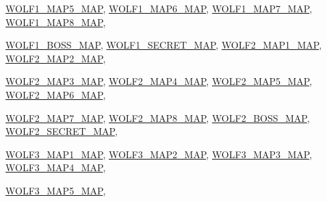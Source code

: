 \begin{DoxyCompactItemize}
\par
\hyperlink{MAPSWL6_8H_a1949852ef0462081a2b248dd4918bb86a4e0bde90495c18df66dc08481ea49be0}{WOLF1\_\-MAP5\_\-MAP}, 
\hyperlink{MAPSWL6_8H_a1949852ef0462081a2b248dd4918bb86ae26f3af31d4810858254489121a1cc4d}{WOLF1\_\-MAP6\_\-MAP}, 
\hyperlink{MAPSWL6_8H_a1949852ef0462081a2b248dd4918bb86a7f93aa33b8f8b41d2484854bac19541f}{WOLF1\_\-MAP7\_\-MAP}, 
\hyperlink{MAPSWL6_8H_a1949852ef0462081a2b248dd4918bb86aa911f72afb434cee8a834bc5ebe10b90}{WOLF1\_\-MAP8\_\-MAP}, 
\par
\hyperlink{MAPSWL6_8H_a1949852ef0462081a2b248dd4918bb86a4cc57d6fdbe6d4e0a703adaefaed0a6a}{WOLF1\_\-BOSS\_\-MAP}, 
\hyperlink{MAPSWL6_8H_a1949852ef0462081a2b248dd4918bb86a2e23490866f782ea85c5ad3a6c9e179f}{WOLF1\_\-SECRET\_\-MAP}, 
\hyperlink{MAPSWL6_8H_a1949852ef0462081a2b248dd4918bb86a8fba6738193812a52e4428cc41f3bac9}{WOLF2\_\-MAP1\_\-MAP}, 
\hyperlink{MAPSWL6_8H_a1949852ef0462081a2b248dd4918bb86a6cb4b566b4502070219c855ee1d81bc4}{WOLF2\_\-MAP2\_\-MAP}, 
\par
\hyperlink{MAPSWL6_8H_a1949852ef0462081a2b248dd4918bb86aef36179cbf5250aa22333ed331e80113}{WOLF2\_\-MAP3\_\-MAP}, 
\hyperlink{MAPSWL6_8H_a1949852ef0462081a2b248dd4918bb86a2da7528dbe4bef94d8cae071c328db9c}{WOLF2\_\-MAP4\_\-MAP}, 
\hyperlink{MAPSWL6_8H_a1949852ef0462081a2b248dd4918bb86ac7d89e85f4f4cd83a469db82b19bcd31}{WOLF2\_\-MAP5\_\-MAP}, 
\hyperlink{MAPSWL6_8H_a1949852ef0462081a2b248dd4918bb86a4473d9cc197c7acc2b3516d4fa17da76}{WOLF2\_\-MAP6\_\-MAP}, 
\par
\hyperlink{MAPSWL6_8H_a1949852ef0462081a2b248dd4918bb86a109a84d23d4e2d9476dd201d1bf565a5}{WOLF2\_\-MAP7\_\-MAP}, 
\hyperlink{MAPSWL6_8H_a1949852ef0462081a2b248dd4918bb86ac7e9ff2da7d29771bbae6b4fa3f9a486}{WOLF2\_\-MAP8\_\-MAP}, 
\hyperlink{MAPSWL6_8H_a1949852ef0462081a2b248dd4918bb86a88f09783575198a9583fbdb3e7c8fe2f}{WOLF2\_\-BOSS\_\-MAP}, 
\hyperlink{MAPSWL6_8H_a1949852ef0462081a2b248dd4918bb86a9ed42ca05cbe822f8b40168c19a4ed77}{WOLF2\_\-SECRET\_\-MAP}, 
\par
\hyperlink{MAPSWL6_8H_a1949852ef0462081a2b248dd4918bb86a0d6791b2c6c686178e630dc8780f3862}{WOLF3\_\-MAP1\_\-MAP}, 
\hyperlink{MAPSWL6_8H_a1949852ef0462081a2b248dd4918bb86ae28f49c42ce451b9907c945b53a8f150}{WOLF3\_\-MAP2\_\-MAP}, 
\hyperlink{MAPSWL6_8H_a1949852ef0462081a2b248dd4918bb86a0bd10b8507e1d5208f7fc7190dd1da82}{WOLF3\_\-MAP3\_\-MAP}, 
\hyperlink{MAPSWL6_8H_a1949852ef0462081a2b248dd4918bb86a90ebcb09ab1567937fd158f38ebd1c60}{WOLF3\_\-MAP4\_\-MAP}, 
\par
\hyperlink{MAPSWL6_8H_a1949852ef0462081a2b248dd4918bb86a80a97ef076ec587cbfe05e7673778499}{WOLF3\_\-MAP5\_\-MAP}, 

\end{DoxyCompactItemize}

